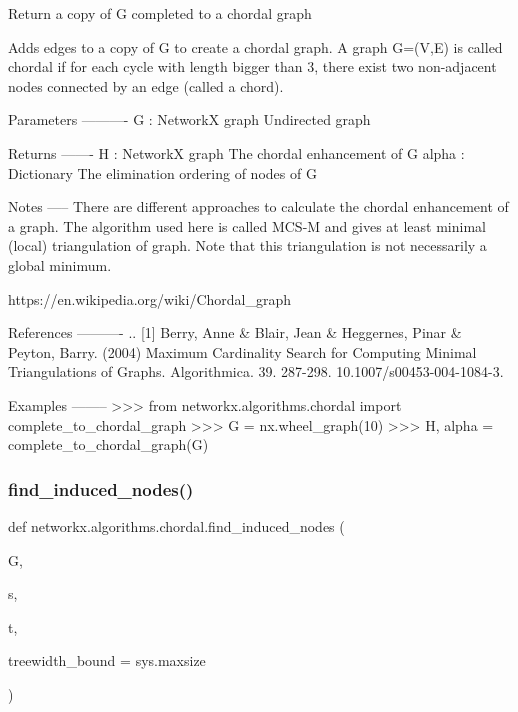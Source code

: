 \begin{DoxyVerb}Return a copy of G completed to a chordal graph

Adds edges to a copy of G to create a chordal graph. A graph G=(V,E) is
called chordal if for each cycle with length bigger than 3, there exist
two non-adjacent nodes connected by an edge (called a chord).

Parameters
----------
G : NetworkX graph
    Undirected graph

Returns
-------
H : NetworkX graph
    The chordal enhancement of G
alpha : Dictionary
        The elimination ordering of nodes of G

Notes
-----
There are different approaches to calculate the chordal
enhancement of a graph. The algorithm used here is called
MCS-M and gives at least minimal (local) triangulation of graph. Note
that this triangulation is not necessarily a global minimum.

https://en.wikipedia.org/wiki/Chordal_graph

References
----------
.. [1] Berry, Anne & Blair, Jean & Heggernes, Pinar & Peyton, Barry. (2004)
       Maximum Cardinality Search for Computing Minimal Triangulations of
       Graphs.  Algorithmica. 39. 287-298. 10.1007/s00453-004-1084-3.

Examples
--------
>>> from networkx.algorithms.chordal import complete_to_chordal_graph
>>> G = nx.wheel_graph(10)
>>> H, alpha = complete_to_chordal_graph(G)
\end{DoxyVerb}
 \mbox{\label{namespacenetworkx_1_1algorithms_1_1chordal_adf8d1e4874cff57394eba12dcab9a5f1}} 
\subsubsection{\texorpdfstring{find\+\_\+induced\+\_\+nodes()}{find\_induced\_nodes()}}
{\footnotesize\ttfamily def networkx.\+algorithms.\+chordal.\+find\+\_\+induced\+\_\+nodes (\begin{DoxyParamCaption}\item[{}]{G,  }\item[{}]{s,  }\item[{}]{t,  }\item[{}]{treewidth\+\_\+bound = {\ttfamily sys.maxsize} }\end{DoxyParamCaption})}

